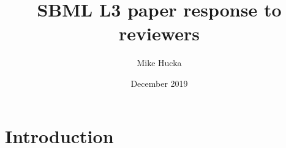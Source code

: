 \documentclass{article}
\title{SBML L3 paper response to reviewers}
\author{Mike Hucka}
\date{December 2019}
\begin{document}
\maketitle

\section{Introduction}
\end{document}
